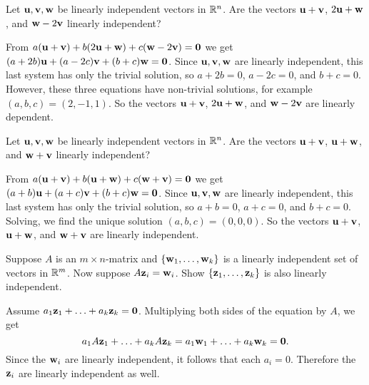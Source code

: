 \begin{ex}
  Let $\mbox{\bf u},\mbox{\bf v},\mbox{\bf w}$ be linearly independent vectors in
  $\mathbb{R}^n$. Are the vectors $\mbox{\bf u}+\mbox{\bf v}$, $2\mbox{\bf u}+\mbox{\bf w}$,
  and $\mbox{\bf w}-2\mbox{\bf v}$ linearly independent?
  \begin{sol}
    From
    $a(\mbox{\bf u}+\mbox{\bf v}) + b(2\mbox{\bf u}+\mbox{\bf w}) +
    c(\mbox{\bf w}-2\mbox{\bf v})=\mbox{\bf 0}$ we get
    $(a+2b)\mbox{\bf u} + (a-2c)\mbox{\bf v} + (b+c)\mbox{\bf w}=\mbox{\bf 0}$.  Since
    $\mbox{\bf u},\mbox{\bf v},\mbox{\bf w}$ are linearly independent, this last
    system has only the trivial solution, so $a+2b=0$, $a-2c=0$, and
    $b+c=0$. However, these three equations have non-trivial
    solutions, for example $(a,b,c)=(2,-1,1)$. So the vectors
    $\mbox{\bf u}+\mbox{\bf v}$, $2\mbox{\bf u}+\mbox{\bf w}$, and
    $\mbox{\bf w}-2\mbox{\bf v}$ are linearly dependent.
  \end{sol}
\end{ex}

\begin{ex}
  Let $\mbox{\bf u},\mbox{\bf v},\mbox{\bf w}$ be linearly independent vectors in
  $\mathbb{R}^n$. Are the vectors $\mbox{\bf u}+\mbox{\bf v}$, $\mbox{\bf u}+\mbox{\bf w}$,
  and $\mbox{\bf w}+\mbox{\bf v}$ linearly independent?
  \begin{sol}
    From
    $a(\mbox{\bf u}+\mbox{\bf v}) + b(\mbox{\bf u}+\mbox{\bf w}) +
    c(\mbox{\bf w}+\mbox{\bf v})=\mbox{\bf 0}$ we get
    $(a+b)\mbox{\bf u} + (a+c)\mbox{\bf v} + (b+c)\mbox{\bf w}=\mbox{\bf 0}$.  Since
    $\mbox{\bf u},\mbox{\bf v},\mbox{\bf w}$ are linearly independent, this last
    system has only the trivial solution, so $a+b=0$, $a+c=0$, and
    $b+c=0$. Solving, we find the unique solution
    $(a,b,c)=(0,0,0)$. So the vectors $\mbox{\bf u}+\mbox{\bf v}$,
    $\mbox{\bf u}+\mbox{\bf w}$, and $\mbox{\bf w}+\mbox{\bf v}$ are linearly
    independent.
  \end{sol}
\end{ex}

\begin{ex}
  Suppose $A$ is an $m\times n$-matrix and
  $\left\{\mbox{\bf w} _{1},\ldots,\mbox{\bf w}_{k}\right\}$ is a linearly independent
  set of vectors in $\mathbb{R}^{m}$. Now suppose
  $A\mbox{\bf z}_{i}=\mbox{\bf w}_{i}$. Show
  $\left\{ \mbox{\bf z}_{1},\ldots,\mbox{\bf z}_{k}\right\}$ is also linearly
  independent.
  \begin{sol}
    Assume
    $a_{1}\mbox{\bf z}_{1}+\ldots+a_{k}\mbox{\bf z}_{k}=\mbox{\bf 0}$. Multiplying
    both sides of the equation by $A$, we get
    \begin{equation*}
      a_{1}A\mbox{\bf z}_{1}+\ldots+a_{k}A\mbox{\bf z}_{k}=
      a_{1}\mbox{\bf w}_{1}+\ldots+a_{k}\mbox{\bf w}_{k}=\mbox{\bf 0}.
    \end{equation*}
    Since the $\mbox{\bf w}_{i}$ are linearly independent, it follows that
    each $a_{i}=0$. Therefore the $\mbox{\bf z}_{i}$ are linearly
    independent as well.
  \end{sol}
\end{ex}

